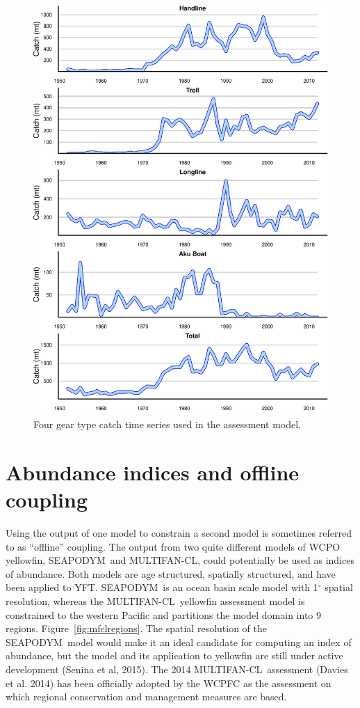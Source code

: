 \documentclass[12pt,letterpaper]{article}
\renewcommand\deg[1]{$^\circ$#1}
\newcommand\SD{SEAPODYM}
\newcommand\MFCL{MULTIFAN-CL}
\begin{document}
\begin{figure}
\begin{center}
\includegraphics[height=0.8\textheight]{./4_gear_catch_history_a.pdf}
\caption{\label{fig:data}
Four gear type catch time series used in the assessment model.
}
\end{center}
\end{figure}

\clearpage
\section{Abundance indices and offline coupling}
\label{sec:index}
Using the output of one model to constrain a second model is sometimes
referred to as ``offline'' coupling. 
The output from two quite different models of WCPO yellowfin,
\SD\ and \MFCL, could potentially be used as indices of abundance.
Both models are age structured, spatially structured, and have been
applied to YFT.
\SD\ is an ocean basin scale model with 1\deg{} spatial resolution,
whereas the \MFCL\ yellowfin assessment model is constrained to the
western Pacific and partitions the model domain into 9 regions.
Figure~\ref{fig:mfclregions}.
The spatial resolution of the \SD\ model would make it an ideal
candidate for computing an index of abundance, but the model and its
application to yellowfin are still under active development (Senina et
al, 2015). 
The 2014 \MFCL\ assessment (Davies et al. 2014) has been officially
adopted by the WCPFC as the assessment on which regional conservation
and management measures are based.
\end{document}
